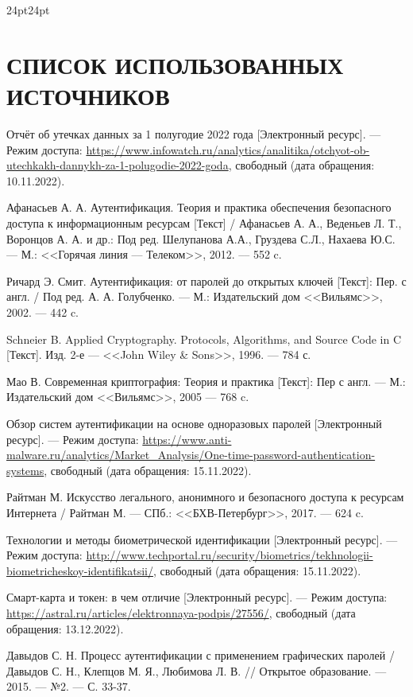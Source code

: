 \titlespacing\section{\parindent}{24pt}{24pt}
\section*{\hfill{\centering СПИСОК ИСПОЛЬЗОВАННЫХ ИСТОЧНИКОВ}\hfill}
\begingroup
\renewcommand{\section}[2]{}
\begin{thebibliography}{}

 Отчёт об утечках данных за 1 полугодие 2022 года [Электронный ресурс]. --- Режим доступа: \url{https://www.infowatch.ru/analytics/analitika/otchyot-ob-utechkakh-dannykh-za-1-polugodie-2022-goda}, свободный (дата обращения: 10.11.2022).

Афанасьев А. А. Аутентификация. Теория и практика обеспечения безопасного доступа к информационным ресурсам [Текст] / Афанасьев А. А., Веденьев Л. Т., Воронцов А. А. и др.: Под ред. Шелупанова А.А., Груздева С.Л., Нахаева Ю.С. --– М.: <<Горячая линия --– Телеком>>, 2012. –-- 552 c.  

Ричард Э. Смит. Аутентификация: от паролей до открытых ключей [Текст]: Пер. с англ. / Под ред. А. А. Голубченко. --- М.: Издательский дом <<Вильямс>>, 2002. --- 442 c.

Schneier B. Applied Cryptography. Protocols, Algorithms, and Source Code in C [Текст]. Изд. 2-е --- <<John Wiley \& Sons>>, 1996. --- 784 с.

Мао В. Современная криптография: Теория и практика [Текст]: Пер с англ. --- М.: Издательский дом <<Вильямс>>, 2005 --- 768 c.

 Обзор систем аутентификации на основе одноразовых паролей [Электронный ресурс]. --- Режим доступа: \url{https://www.anti-malware.ru/analytics/Market_Analysis/One-time-password-authentication-systems}, свободный (дата обращения: 15.11.2022).

Райтман М. Искусство легального, анонимного и безопасного доступа к ресурсам Интернета / Райтман М. --- СПб.: <<БХВ-Петербург>>, 2017. --- 624 c.

Технологии и методы биометрической идентификации [Электронный ресурс]. --- Режим доступа: \url{http://www.techportal.ru/security/biometrics/tekhnologii-biometricheskoy-identifikatsii/}, свободный (дата обращения: 15.11.2022).

Смарт-карта и токен: в чем отличие [Электронный ресурс]. --- Режим доступа: \url{https://astral.ru/articles/elektronnaya-podpis/27556/}, свободный (дата обращения: 13.12.2022).

Давыдов С. Н. Процесс аутентификации с применением графических паролей / Давыдов С. Н., Клепцов М. Я., Любимова Л. В. // Открытое образование. --- 2015. --- №2. --- С. 33-37.
\end{thebibliography}
\endgroup
